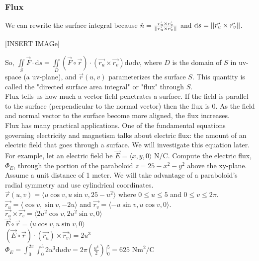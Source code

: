 \subsubsection{Flux}
\noindent
We can rewrite the surface integral because $\hat{n}=\frac{\vec{r_u}\times\vec{r_v}}{\left|\left|\vec{r_u}\times\vec{r_v}\right|\right|}$ and $\mathrm{d}s=\left|\left|\vec{r_u}\times\vec{r_v}\right|\right|$.

[INSERT IMAGe]

\noindent
So, $\iint\limits_{S}{\vec{F}\cdot\mathrm{d}s}=\iint\limits_{D}{\left(\vec{F}\circ\vec{r}\right)\cdot\left(\vec{r_u}\times\vec{r_v}\right)\mathrm{d}u\mathrm{d}v}$, where $D$ is the domain of $S$ in uv-space (a uv-plane), and $\vec{r}(u,v)$ parameterizes the surface $S$. This quantity is called the "directed surface area integral" or "flux" through $S$.\\

\noindent
Flux tells us how much a vector field penetrates a surface. If the field is parallel to the surface (perpendicular to the normal vector) then the flux is 0. As the field and normal vector to the surface become more aligned, the flux increases. \\

\noindent
Flux has many practical applications. One of the fundamental equations governing electricity and magnetism talks about electric flux: the amount of an electric field that goes through a surface. We will investigate this equation later.\\

\noindent
For example, let an electric field be $\vec{E}=\langle x,y,0\rangle\text{ N}/\text{C}$. Compute the electric flux, $\Phi_{E}$, through the portion of the paraboloid $z=25-x^2-y^2$ above the xy-plane. Assume a unit distance of 1 meter.
\indent
We will take advantage of a paraboloid's radial symmetry and use cylindrical coordinates.\\
\indent
$\vec{r}(u,v)=\langle u\cos{v}, u\sin{v}, 25-u^2\rangle$ where $0\leq u\leq 5$ and $0\leq v\leq 2\pi$.\\
\indent
$\vec{r_u}=\langle \cos{v}, \sin{v}, -2u\rangle$ and $\vec{r_v}=\langle -u\sin{v}, u\cos{v}, 0\rangle$.\\
\indent
$\vec{r_u}\times\vec{r_v}=\langle 2u^2\cos{v}, 2u^2\sin{v}, 0\rangle$\\
\indent
$\vec{E}\circ\vec{r}=\langle u\cos{v}, u\sin{v}, 0\rangle$\\
\indent
$\left(\vec{E}\circ\vec{r}\right)\cdot(\vec{r_u})\times\vec{r_v})=2u^3$\\
\indent
$\Phi_{E}=\int_{0}^{2\pi}{\int_{0}^{5}{2u^3\mathrm{d}u}\mathrm{d}v}=2\pi\left(\frac{u^4}{2}\right)\rvert_{0}^{5}=625\text{ Nm}^2/\text{C}$\\